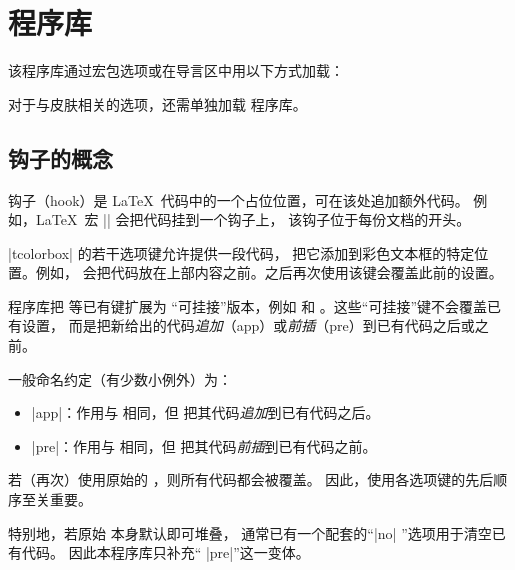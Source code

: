\clearpage
\section{ 程序库}\label{sec:hooks}%
%
该程序库通过宏包选项或在导言区中用以下方式加载：
\begin{dispListing}
\end{dispListing}

对于与皮肤相关的选项，还需单独加载  程序库。


\subsection{钩子的概念}
钩子（hook）是 \LaTeX\ 代码中的一个占位位置，可在该处追加额外代码。
例如，\LaTeX\ 宏 |\AtBeginDocument| 会把代码挂到一个钩子上，
该钩子位于每份文档的开头。

|tcolorbox| 的若干选项键允许提供一段代码，
把它添加到彩色文本框的特定位置。例如，
会把代码放在上部内容之前。之后再次使用该键会覆盖此前的设置。

 程序库把  等已有键扩展为
\enquote{可挂接}版本，例如  和
。这些\enquote{可挂接}键不会覆盖已有设置，
而是把新给出的代码\emph{追加}（app）或\emph{前插}（pre）到已有代码之后或之前。

一般命名约定（有少数小例外）为：
\begin{itemize}
\item {} |app|：作用与  相同，但
  把其代码\emph{追加}到已有代码之后。
\item {} |pre|：作用与  相同，但
  把其代码\emph{前插}到已有代码之前。
\end{itemize}
若（再次）使用原始的 ，则所有代码都会被覆盖。
因此，使用各选项键的先后顺序至关重要。

特别地，若原始  本身默认即可堆叠，
通常已有一个配套的\enquote{|no| }选项用于清空已有代码。
因此本程序库只补充\enquote{ |pre|}这一变体。

\enlargethispage*{2cm}

